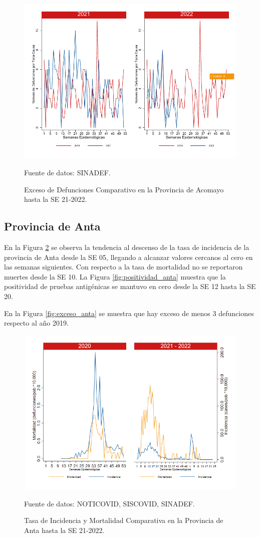 \documentclass[12pt,a4paper,openany]{book}
\begin{document}
	\begin{figure}[h]
		\caption{Exceso de Defunciones Comparativo en la Provincia de Acomayo hasta la SE 21-2022.}\label{fig:exceso_acomayo}
		\begin{center}
			\includegraphics[width=0.7\linewidth]{../figuras/exceso_1.pdf}
		\end{center}
		{\footnotesize {Fuente de datos: SINADEF.}}
	\end{figure}
	
	\clearpage
	
	\subsection*{Provincia de Anta}
	\noindent En la Figura \ref{fig:inc_mort_anta} se observa la tendencia al descenso de la tasa de incidencia de la provincia de Anta desde la SE 05,  llegando a alcanzar valores cercanos al cero en las semanas siguientes. Con respecto a la tasa de mortalidad no se reportaron muertes desde la SE 10. 
	\noindent La Figura
	\ref{fig:positividad_anta} muestra que la positividad de pruebas antigénicas se mantuvo en cero desde la SE 12 hasta la SE 20. 
	
	En la Figura \ref{fig:exceso_anta} se muestra que hay exceso de menos 3 defunciones respecto al año 2019.
	
	\begin{figure}[h]
		\caption{Tasa de Incidencia y Mortalidad Comparativa en la Provincia de Anta hasta la SE 21-2022.}\label{fig:inc_mort_anta}
		\begin{center}
			\includegraphics[width=0.85\linewidth]{../figuras/incidencia_mortalidad_20_21_2.png}
		\end{center}
		{\footnotesize {Fuente de datos: NOTICOVID, SISCOVID, SINADEF.}}
	\end{figure}
	
\end{document}
